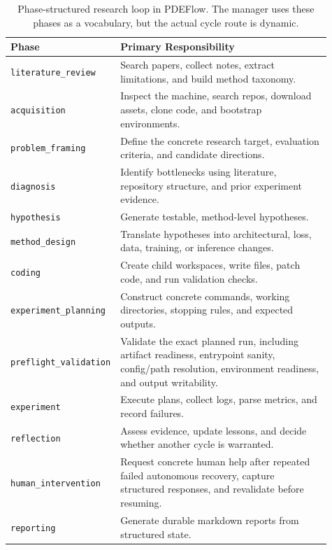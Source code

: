 \documentclass[11pt]{article}
\begin{document}
\begin{table}[t]
\centering
\small
\begin{tabular}{p{0.19\linewidth}p{0.72\linewidth}}
\toprule
\textbf{Phase} & \textbf{Primary Responsibility} \\
\midrule
\texttt{literature\_review} & Search papers, collect notes, extract limitations, and build method taxonomy. \\
\texttt{acquisition} & Inspect the machine, search repos, download assets, clone code, and bootstrap environments. \\
\texttt{problem\_framing} & Define the concrete research target, evaluation criteria, and candidate directions. \\
\texttt{diagnosis} & Identify bottlenecks using literature, repository structure, and prior experiment evidence. \\
\texttt{hypothesis} & Generate testable, method-level hypotheses. \\
\texttt{method\_design} & Translate hypotheses into architectural, loss, data, training, or inference changes. \\
\texttt{coding} & Create child workspaces, write files, patch code, and run validation checks. \\
\texttt{experiment\_planning} & Construct concrete commands, working directories, stopping rules, and expected outputs. \\
\texttt{preflight\_validation} & Validate the exact planned run, including artifact readiness, entrypoint sanity, config/path resolution, environment readiness, and output writability. \\
\texttt{experiment} & Execute plans, collect logs, parse metrics, and record failures. \\
\texttt{reflection} & Assess evidence, update lessons, and decide whether another cycle is warranted. \\
\texttt{human\_intervention} & Request concrete human help after repeated failed autonomous recovery, capture structured responses, and revalidate before resuming. \\
\texttt{reporting} & Generate durable markdown reports from structured state. \\
\bottomrule
\end{tabular}
\caption{Phase-structured research loop in PDEFlow. The manager uses these phases as a vocabulary, but the actual cycle route is dynamic.}
\label{tab:phases}
\end{table}
\end{document}
